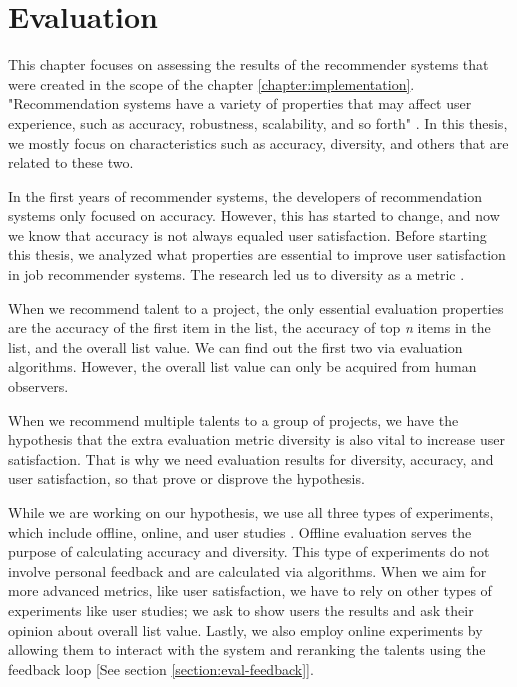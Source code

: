 
\chapter{Evaluation}\label{chapter:evaluation}

This chapter focuses on assessing the results of the recommender systems that were created in the scope of the chapter \ref{chapter:implementation}. "Recommendation systems have a variety of properties that may affect user experience, such as accuracy, robustness, scalability, and so forth" \cite{shani2011evaluating}. In this thesis, we mostly focus on characteristics such as accuracy, diversity, and others that are related to these two. 

In the first years of recommender systems, the developers of recommendation systems only focused on accuracy. However, this has started to change, and now we know that accuracy is not always equaled user satisfaction. Before starting this thesis, we analyzed what properties are essential to improve user satisfaction in job recommender systems. The research led us to diversity as a metric \cite{castells2015novelty}.

When we recommend talent to a project, the only essential evaluation properties are the accuracy of the first item in the list, the accuracy of top \textit{n} items in the list, and the overall list value. We can find out the first two via evaluation algorithms. However, the overall list value can only be acquired from human observers. 

When we recommend multiple talents to a group of projects, we have the hypothesis that the extra evaluation metric diversity is also vital to increase user satisfaction. That is why we need evaluation results for diversity, accuracy, and user satisfaction, so that prove or disprove the hypothesis. 

While we are working on our hypothesis, we use all three types of experiments, which include offline, online, and user studies \cite{shani2011evaluating}. Offline evaluation serves the purpose of calculating accuracy and diversity. This type of experiments do not involve personal feedback and are calculated via algorithms. When we aim for more advanced metrics, like user satisfaction, we have to rely on other types of experiments like user studies; we ask to show users the results and ask their opinion about overall list value. Lastly, we also employ online experiments by allowing them to interact with the system and reranking the talents using the feedback loop [See section \ref{section:eval-feedback}]. 

